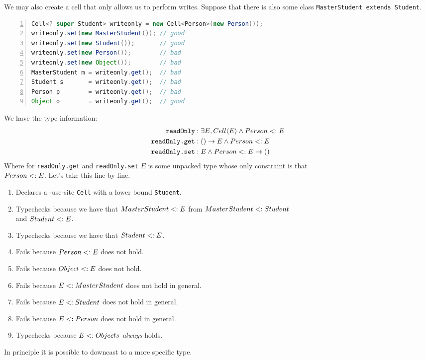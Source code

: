 \documentclass{article}
\begin{document}
\begin{example}
We may also create a \contra{} cell that only allows us to perform writes. Suppose that there is also some class \texttt{MasterStudent extends Student}.
\begin{lstlisting}[escapechar=|, language=Java, numbers=left]
Cell<? super Student> writeonly = new Cell<Person>(new Person());
writeonly.set(new MasterStudent()); // good
writeonly.set(new Student());       // good
writeonly.set(new Person());        // bad
writeonly.set(new Object());        // bad
MasterStudent m = writeonly.get();  // bad
Student s       = writeonly.get();  // bad
Person p        = writeonly.get();  // bad
Object o        = writeonly.get();  // good
\end{lstlisting}

We have the type information:
\begin{align*}
\texttt{readOnly} &: \exists E, Cell \langle E \rangle \wedge Person <: E \\
\texttt{readOnly.get} &: () \rightarrow E \wedge Person <: E \\
\texttt{readOnly.set} &: E \wedge Person <: E \rightarrow ()
\end{align*}
Where for \texttt{readOnly.get} and \texttt{readOnly.set} $E$ is some unpacked type whose only constraint is that \\ $Person <: E$.
Let's take this line by line.

\begin{enumerate}
\item Declares a \contra{}-use-site \texttt{Cell} with a lower bound \texttt{Student}.
\item Typechecks because we have that $MasterStudent <: E$ from $MasterStudent <: Student$ \\ and $Student <: E$.
\item Typechecks because we have that $Student <: E$.
\item Fails because $Person <: E$ does not hold.
\item Fails because $Object <: E$ does not hold.
\item Fails because $E <: MasterStudent$ does not hold in general.
\item Fails because $E <: Student$ does not hold in general.
\item Fails because $E <: Person$ does not hold in general.
\item Typechecks because $E <: Objects$ \textit{always} holds.
\end{enumerate}
In principle it is possible to downcast to a more specific type.
\end{example}
\end{document}
